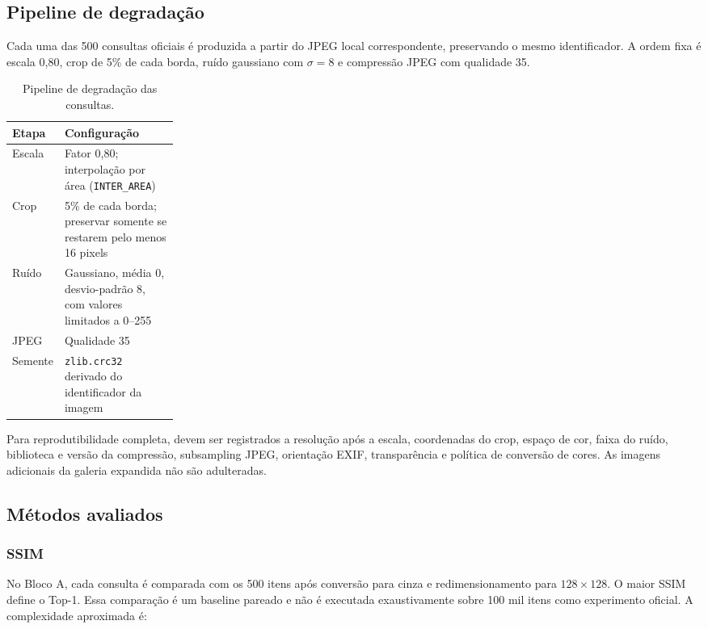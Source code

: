 \documentclass[12pt]{article}
\begin{document}
\subsection{Pipeline de degradação}

Cada uma das 500 consultas oficiais é produzida a partir do JPEG local
correspondente, preservando o mesmo identificador. A ordem fixa é escala
0,80, crop de 5\% de cada borda, ruído gaussiano com $\sigma=8$ e compressão
JPEG com qualidade 35.

\begin{table}[H]
\centering
\caption{Pipeline de degradação das consultas.}
\label{tab:degradacao}
\begin{tabularx}{\linewidth}{p{0.24\linewidth}Y}
\toprule
\textbf{Etapa} & \textbf{Configuração}\\
\midrule
Escala & Fator 0,80; interpolação por área (\texttt{INTER\_AREA})\\
Crop & 5\% de cada borda; preservar somente se restarem pelo menos 16 pixels\\
Ruído & Gaussiano, média 0, desvio-padrão 8, com valores limitados a 0--255\\
JPEG & Qualidade 35\\
Semente & \texttt{zlib.crc32} derivado do identificador da imagem\\
\bottomrule
\end{tabularx}
\end{table}

Para reprodutibilidade completa, devem ser registrados a resolução após a
escala, coordenadas do crop, espaço de cor, faixa do ruído, biblioteca e
versão da compressão, subsampling JPEG, orientação EXIF, transparência e
política de conversão de cores. As imagens adicionais da galeria expandida
não são adulteradas.

\subsection{Métodos avaliados}

\subsubsection{SSIM}

No Bloco A, cada consulta é comparada com os 500 itens após conversão para
cinza e redimensionamento para $128\times128$. O maior SSIM define o Top-1.
Essa comparação é um baseline pareado e não é executada exaustivamente sobre
100 mil itens como experimento oficial. A complexidade aproximada é:
\end{document}
